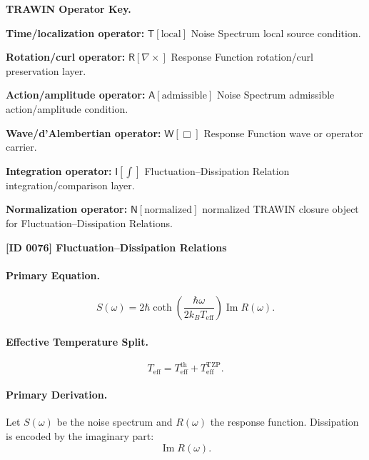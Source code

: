 \par\vspace{0.45\baselineskip}
\noindent\begin{minipage}[t]{\linewidth}
\begingroup
\small
\raggedright
\textbf{TRAWIN Operator Key.}\par
\noindent\textbf{Time/localization operator:} $\mathsf{T}\!\left[\mathrm{local}\right]$ Noise Spectrum local source condition.\par
\noindent\textbf{Rotation/curl operator:} $\mathsf{R}\!\left[\nabla\times\right]$ Response Function rotation/curl preservation layer.\par
\noindent\textbf{Action/amplitude operator:} $\mathsf{A}\!\left[\mathrm{admissible}\right]$ Noise Spectrum admissible action/amplitude condition.\par
\noindent\textbf{Wave/d'Alembertian operator:} $\mathsf{W}\!\left[\Box\right]$ Response Function wave or operator carrier.\par
\noindent\textbf{Integration operator:} $\mathsf{I}\!\left[\int\right]$ Fluctuation--Dissipation Relation integration/comparison layer.\par
\noindent\textbf{Normalization operator:} $\mathsf{N}\!\left[\mathrm{normalized}\right]$ normalized TRAWIN closure object for Fluctuation--Dissipation Relations.\par
\endgroup
\end{minipage}

\clearpage
\noindent\textbf{[ID 0076] Fluctuation--Dissipation Relations}\par
\vspace{0.35em}
\paragraph{Primary Equation.}
\begin{equation}
S(\omega)
=
2\hbar
\coth\left(
\frac{\hbar\omega}{2k_B T_{\mathrm{eff}}}
\right)
\operatorname{Im}R(\omega).
\end{equation}

\paragraph{Effective Temperature Split.}
\begin{equation}
T_{\mathrm{eff}}
=
T_{\mathrm{eff}}^{\mathrm{th}}
+
T_{\mathrm{eff}}^{\mathrm{TZP}} .
\end{equation}

\paragraph{Primary Derivation.}
Let $S(\omega)$ be the noise spectrum and $R(\omega)$ the response function.  
Dissipation is encoded by the imaginary part:
\begin{equation}
\operatorname{Im}R(\omega).
\end{equation}

